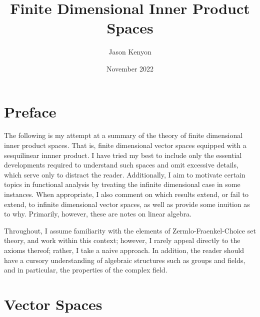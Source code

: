 \documentclass[oneside, 12pt]{book}
\title{Finite Dimensional Inner Product Spaces}
\author{Jason Kenyon}
\date{November 2022}
\theoremstyle{definition}
\begin{document}
\frontmatter
\maketitle
\cleardoublepage
{}
\tableofcontents
\chapter*{Preface}
The following is my attempt at a summary of the theory of finite dimensional inner product spaces. That is, finite dimensional vector spaces equipped with a sesquilinear innner product. I have tried my best to include only the essential developments required to understand such spaces and omit excessive details, which serve only to distract the reader. Additionally, I aim to motivate certain topics in functional analysis by treating the infinite dimensional case in some instances. When appropriate, I also comment on which results extend, or fail to extend, to infinite dimensional vector spaces, as well as provide some inuition as to why. Primarily, however, these are notes on linear algebra.

Throughout, I assume familiarity with the elements of Zermlo-Fraenkel-Choice set theory, and work within this context; however, I rarely appeal directly to the axioms thereof; rather, I take a naive approach. In addition, the reader should have a cursory understanding of algebraic structures such as groups and fields, and in particular, the properties of the complex field.
\mainmatter
\chapter{Vector Spaces}
\end{document}
